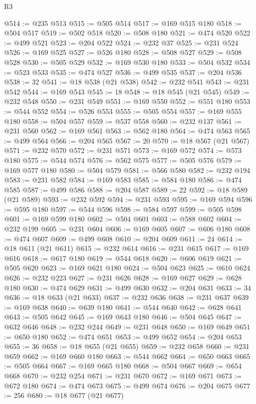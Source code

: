 \begin{lexlean}{R3}
\begin{coremodule}
@514 := @235 @513
@515 := @505 @514
@517 := @169 @515 @180
@518 := @504 @517
@519 := @502 @518
@520 := @508 @180
@521 := @474 @520
@522 := @499 @521
@523 := @204 @522
@524 := @232 @37
@525 := @231 @524
@526 := @169 @525
@527 := @526 @180
@528 := @508 @527
@529 := @508 @528
@530 := @505 @529
@532 := @169 @530 @180
@533 := @504 @532
@534 := @523 @533
@535 := @474 @527
@536 := @499 @535
@537 := @204 @536
@538 := 32
@541 := @18 @538 (@21 @538)
@542 := @232 @541
@543 := @231 @542
@544 := @169 @543
@545 := 18
@548 := @18 @545 (@21 @545)
@549 := @232 @548
@550 := @231 @549
@551 := @169 @550
@552 := @551 @180
@553 := @544 @552
@554 := @526 @553
@555 := @505 @554
@557 := @169 @555 @180
@558 := @504 @557
@559 := @537 @558
@560 := @232 @137
@561 := @231 @560
@562 := @169 @561
@563 := @562 @180
@564 := @474 @563
@565 := @499 @564
@566 := @204 @565
@567 := 20
@570 := @18 @567 (@21 @567)
@571 := @232 @570
@572 := @231 @571
@573 := @169 @572
@574 := @573 @180
@575 := @544 @574
@576 := @562 @575
@577 := @505 @576
@579 := @169 @577 @180
@580 := @504 @579
@581 := @566 @580
@582 := @232 @194
@583 := @231 @582
@584 := @169 @583
@585 := @584 @180
@586 := @474 @585
@587 := @499 @586
@588 := @204 @587
@589 := 22
@592 := @18 @589 (@21 @589)
@593 := @232 @592
@594 := @231 @593
@595 := @169 @594
@596 := @595 @180
@597 := @544 @596
@598 := @584 @597
@599 := @505 @598
@601 := @169 @599 @180
@602 := @504 @601
@603 := @588 @602
@604 := @232 @199
@605 := @231 @604
@606 := @169 @605
@607 := @606 @180
@608 := @474 @607
@609 := @499 @608
@610 := @204 @609
@611 := 24
@614 := @18 @611 (@21 @611)
@615 := @232 @614
@616 := @231 @615
@617 := @169 @616
@618 := @617 @180
@619 := @544 @618
@620 := @606 @619
@621 := @505 @620
@623 := @169 @621 @180
@624 := @504 @623
@625 := @610 @624
@626 := @232 @223
@627 := @231 @626
@628 := @169 @627
@629 := @628 @180
@630 := @474 @629
@631 := @499 @630
@632 := @204 @631
@633 := 34
@636 := @18 @633 (@21 @633)
@637 := @232 @636
@638 := @231 @637
@639 := @169 @638
@640 := @639 @180
@641 := @544 @640
@642 := @628 @641
@643 := @505 @642
@645 := @169 @643 @180
@646 := @504 @645
@647 := @632 @646
@648 := @232 @244
@649 := @231 @648
@650 := @169 @649
@651 := @650 @180
@652 := @474 @651
@653 := @499 @652
@654 := @204 @653
@655 := 36
@658 := @18 @655 (@21 @655)
@659 := @232 @658
@660 := @231 @659
@662 := @169 @660 @180
@663 := @544 @662
@664 := @650 @663
@665 := @505 @664
@667 := @169 @665 @180
@668 := @504 @667
@669 := @654 @668
@670 := @232 @254
@671 := @231 @670
@672 := @169 @671
@673 := @672 @180
@674 := @474 @673
@675 := @499 @674
@676 := @204 @675
@677 := 256
@680 := @18 @677 (@21 @677)

\end{coremodule}
\end{lexlean}

